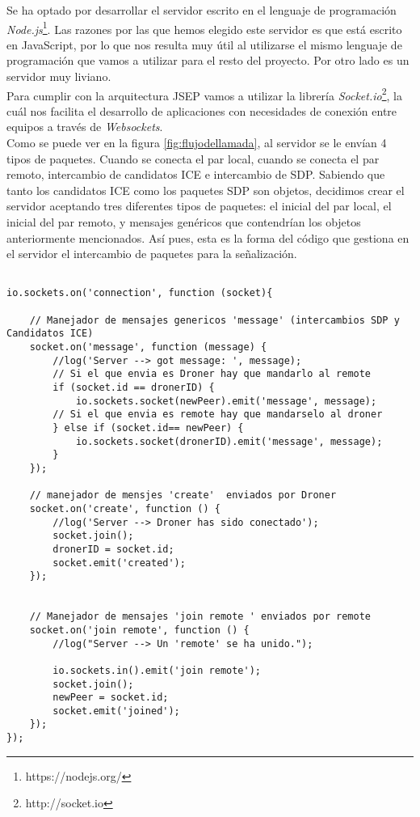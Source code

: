 Se ha optado por desarrollar el servidor escrito en el lenguaje de programación \emph{Node.js}\footnote{https://nodejs.org/}. Las razones por las que hemos elegido este servidor es que está escrito en JavaScript, por lo que nos resulta muy útil al utilizarse el mismo lenguaje de programación que vamos a utilizar para el resto del proyecto. Por otro lado es un servidor muy liviano.\\

Para cumplir con la arquitectura JSEP vamos a utilizar la librería \emph{Socket.io}\footnote{http://socket.io}, la cuál nos facilita el desarrollo de aplicaciones con necesidades de conexión entre equipos a través de \emph{Websockets}.\\

Como se puede ver en la figura \ref{fig:flujodellamada}, al servidor se le envían 4 tipos de paquetes. Cuando se conecta el par local, cuando se conecta el par remoto, intercambio de candidatos ICE e intercambio de SDP. Sabiendo que tanto los candidatos ICE como los paquetes SDP son objetos, decidimos crear el servidor aceptando tres diferentes tipos de paquetes: el inicial del par local, el inicial del par remoto, y mensajes genéricos que contendrían los objetos anteriormente mencionados. Así pues, esta es la forma del código que gestiona en el servidor el intercambio de paquetes para la señalización.\\

\begin{lstlisting}[caption=Núcleo servidor de señalización]

io.sockets.on('connection', function (socket){

	// Manejador de mensajes genericos 'message' (intercambios SDP y Candidatos ICE)
	socket.on('message', function (message) {
		//log('Server --> got message: ', message);
		// Si el que envia es Droner hay que mandarlo al remote
		if (socket.id == dronerID) {
			io.sockets.socket(newPeer).emit('message', message);
		// Si el que envia es remote hay que mandarselo al droner
		} else if (socket.id== newPeer) {
			io.sockets.socket(dronerID).emit('message', message);
		} 
	});

	// manejador de mensjes 'create'  enviados por Droner
	socket.on('create', function () {
		//log('Server --> Droner has sido conectado');
		socket.join();
		dronerID = socket.id;
		socket.emit('created');
	});
	

	// Manejador de mensajes 'join remote ' enviados por remote
	socket.on('join remote', function () {
		//log("Server --> Un 'remote' se ha unido.");
		
		io.sockets.in().emit('join remote');
		socket.join();
		newPeer = socket.id;
		socket.emit('joined');
	});
});
\end{lstlisting}

